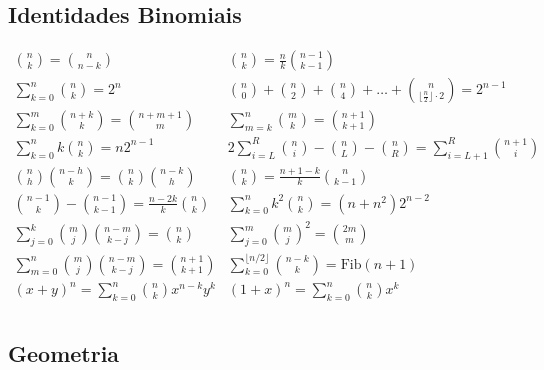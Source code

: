     \subsection{Identidades Binomiais}
    $$
        \begin{array}{cc}
        \binom{n}{k} = \binom{n}{n-k} & 
        \binom{n}{k} = \frac{n}{k}\binom{n-1}{k-1} 
        \\[10pt]
        \sum_{k = 0}^n \binom{n}{k} = 2^n & 
        \binom{n}{0} + \binom{n}{2} + \binom{n}{4} + \dots + \binom{n}{\lfloor \frac{n}{2} \rfloor \cdot 2} = 2^{n-1}
        \\[10pt]
        \sum_{k = 0}^m \binom{n+k}{k} = \binom{n+m+1}{m} & 
         \sum_{m = k}^n \binom{m}{k} = \binom{n+1}{k+1}
        \\[10pt]
        \sum_{k = 0}^n k\binom{n}{k} = n 2^{n-1} &
        2\sum_{i = L}^R \binom{n}{i} - \binom{n}{L} - \binom{n}{R} = \sum_{i = L+1}^R \binom{n+1}{i}
        \\[10pt]
        \binom{n}{h}\binom{n-h}{k} = \binom{n}{k}\binom{n-k}{h} &
        \binom{n}{k} = \frac{n+1-k}{k} \binom{n}{k-1}
        \\[10pt]
         \binom{n-1}{k} - \binom{n-1}{k-1} = \frac{n - 2k}{k} \binom{n}{k} &
        \sum_{k = 0}^n k^2 \binom{n}{k} = (n + n^2)2^{n-2}
        \\[10pt]
        \sum_{j = 0}^k\binom{m}{j} \binom{n-m}{k-j} = \binom{n}{k} &
        \sum_{j = 0}^m \binom{m}{j}^2 = \binom{2m}{m}
        \\[10pt]
        \sum_{m = 0}^n \binom{m}{j} \binom{n-m}{k-j} = \binom{n+1}{k+1} & 
        \sum_{k=0}^{\lfloor n/2 \rfloor} \binom{n-k}{k} = \text{Fib}(n+1)
        \\[10pt] 
        (x + y)^{n} = \sum_{k=0}^{n} \binom{n}{k} x^{n-k} y^{k} &
        (1 + x)^{n} = \sum_{k=0}^{n} \binom{n}{k} x^{k}
        \\[10pt]
        \end{array}
    $$
    \subsection{Geometria}
